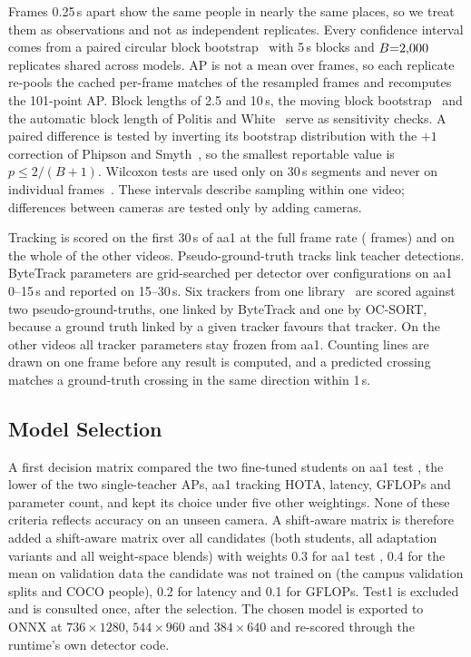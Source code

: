 Frames 0.25\,s apart show the same people in nearly the same places, so we treat them as observations and not as
independent replicates. Every confidence interval comes from a paired circular block
bootstrap~\cite{politis1992cbb} with 5\,s blocks and $B{=}2{,}000$ replicates shared across models. AP is not a mean
over frames, so each replicate re-pools the cached per-frame matches of the resampled frames and recomputes the
101-point AP. Block lengths of 2.5 and 10\,s, the moving block bootstrap~\cite{kunsch1989} and the automatic block
length of Politis and White~\cite{politis2004block,patton2009correction} serve as sensitivity checks. A paired
difference is tested by inverting its bootstrap distribution with the $+1$ correction of Phipson and
Smyth~\cite{phipson2010pvalues}, so the smallest reportable value is $p\le 2/(B{+}1)$. Wilcoxon tests are used only
on 30\,s segments and never on individual frames~\cite{dror2018hitchhiker}. These intervals describe sampling within
one video; differences between cameras are tested only by adding cameras.

Tracking is scored on the first 30\,s of aa1 at the full frame rate (\GtFrames{} frames) and on the whole of the
other videos. Pseudo-ground-truth tracks link teacher detections. ByteTrack parameters are grid-searched per detector
over \GridSize{} configurations on aa1 0--15\,s and reported on 15--30\,s. Six trackers from one
library~\cite{trackerslib} are scored against two pseudo-ground-truths, one linked by ByteTrack and one by OC-SORT,
because a ground truth linked by a given tracker favours that tracker. On the other videos all tracker parameters
stay frozen from aa1. Counting lines are drawn on one frame before any result is computed, and a predicted crossing
matches a ground-truth crossing in the same direction within 1\,s.

\subsection{Model Selection}
\label{sec:select}
A first decision matrix compared the two fine-tuned students on aa1 test \AP{}, the lower of the two
single-teacher APs, aa1 tracking HOTA, latency, GFLOPs and parameter count, and kept its choice under five other
weightings. None of these criteria reflects accuracy on an unseen camera. A shift-aware matrix is therefore added a shift-aware matrix over all
\SrN{} candidates (both students, all adaptation variants and all weight-space blends) with weights 0.3 for aa1 test
\AP{}, 0.4 for the mean \AP{} on validation data the candidate was not trained on (the campus validation splits and
COCO people), 0.2 for latency and 0.1 for GFLOPs. Test1 is excluded and is consulted once, after the selection.
The chosen model is exported to ONNX at $736{\times}1280$, $544{\times}960$ and $384{\times}640$ and re-scored
through the runtime's own detector code.

